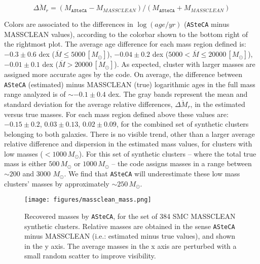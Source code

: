 \documentclass{aa}
\begin{document}
\begin{appendix}
\begin{equation}
\overline{\Delta M_r} = (M_{\mathtt{ASteCA}}-M_{MASSCLEAN})/(M_{\mathtt
{ASteCA}}+M_{MASSCLEAN})
\label{eq:rel_diffs2}
\end{equation}

\noindent Colors are associated to the differences in $\log(age/yr)$
(\texttt{ASteCA} minus MASSCLEAN values), according to the colorbar shown to the
bottom right of the rightmost plot. The average age difference for each mass
region defined is: 
$-0.3{\pm}0.6$ dex ($\overline{M}{\le}5000\,[M_{\odot}]$),
$-0.04{\pm}0.2$ dex ($5000{<}\overline{M}{\le}20000\,[M_{\odot}]$),
$-0.01{\pm}0.1$ dex ($\overline{M}{>}20000\,[M_{\odot}]$). As expected, cluster
with larger masses are assigned more accurate ages by the code.
On average, the difference between \texttt{ASteCA} (estimated) minus MASSCLEAN 
(true) logarithmic ages in the full mass range analyzed is of ${\sim}-0.1
{\pm}0.4$ dex.
%
The gray bands represent the mean and standard deviation for the average
relative differences, $\overline{\Delta M_r}$, in the estimated versus true
masses. For each mass region defined above these values are: $-0.15{\pm}0.2$,
$0.03{\pm}0.13$, $0.02{\pm}0.09$, for the combined set of synthetic clusters
belonging to both galaxies.
There is no visible trend, other than a larger average relative difference and
dispersion in the estimated mass values, for clusters with low masses
(${<}1000\,M_{\odot}$). For this set of synthetic clusters -- where the total
true mass is either $500\,M_{\odot}$ or $1000\,M_{\odot}$ -- the code assigns
masses in a range between ${\sim}200$ and 3000 $M_{\odot}$.
We find that \texttt{ASteCA} will underestimate these low mass clusters' masses
by approximately ${\sim}250\,M_{\odot}$.

\begin{figure*}
\texttt{[image: figures/massclean\_mass.png]}
\caption{Recovered masses by \texttt{ASteCA}, for the set of 384 SMC MASSCLEAN
synthetic clusters. Relative masses are obtained in the sense
\texttt{ASteCA} minus MASSCLEAN (i.e.: estimated minus true values), and shown
in the y axis. The average masses in the x axis are perturbed with a small
random scatter to improve visibility.}
\label{fig:massclean_mass}
\end{figure*}


\end{appendix}
\end{document}
